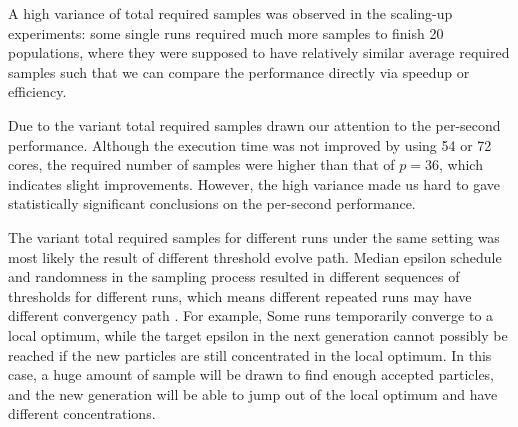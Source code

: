 A high variance of total required samples was observed in the scaling-up experiments: some single runs required much more samples to finish 20 populations, where they were supposed to have relatively similar average required samples such that we can compare the performance directly via speedup or efficiency. 

Due to the variant total required samples drawn our attention to the per-second performance. Although the execution time was not improved by using 54 or 72 cores, the required number of samples were higher than that of $p=36$, which indicates slight improvements. However, the high variance made us hard to gave statistically significant conclusions on the per-second performance.


The variant total required samples for different runs under the same setting was most likely the result of different threshold evolve path. Median epsilon schedule and randomness in the sampling process resulted in different sequences of thresholds for different runs, which means different repeated runs may have different convergency path \cite{threshold}. For example, Some runs temporarily converge to a local optimum, while the target epsilon in the next generation cannot possibly be reached if the new particles are still concentrated in the local optimum. In this case, a huge amount of sample will be drawn to find enough accepted particles, and the new generation will be able to jump out of the local optimum and have different concentrations. 

